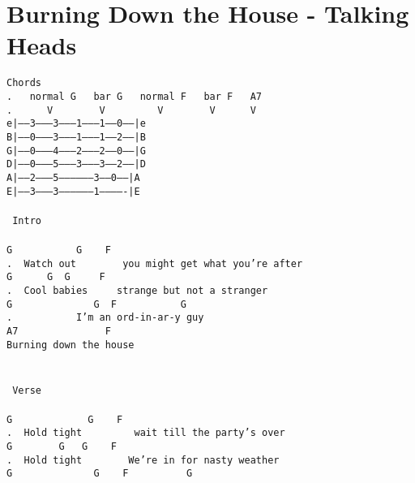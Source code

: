 \newpage
\section{Burning Down the House - Talking Heads}
\label{Burning Down the House - Talking Heads}
\texttt{Chords\\
. \ \ normal\ G\ \ \ bar\ G\ \ \ normal\ F\ \ \ bar\ F\ \ \ A7\\
. \ \ \ \ \ V\ \ \ \ \ \ \ \ V\ \ \ \ \ \ \ \ \ V\ \ \ \ \ \ \ \ V\ \ \ \ \ \ V\\
e|------3--------3---------1--------1------0------|e\\
B|------0--------3---------1--------1------2------|B\\
G|------0--------4---------2--------2------0------|G\\
D|------0--------5---------3--------3------2------|D\\
A|------2--------5------------------3------0------|A\\
E|------3--------3------------------1-------------|E\\
\\
\lbrack\ Intro\rbrack\\
\\
G\ \ \ \ \ \ \ \ \ \ \ G\ \ \ \ F\\
. \ Watch\ out\ \ \ \ \ \ \ \ you\ might\ get\ what\ you're\ after\\
G\ \ \ \ \ \ G\ \ G\ \ \ \ \ F\\
. \ Cool\ babies\ \ \ \ \ strange\ but\ not\ a\ stranger\\
G\ \ \ \ \ \ \ \ \ \ \ \ \ \ G\ \ F\ \ \ \ \ \ \ \ \ \ \ G\\
. \ \ \ \ \ \ \ \ \ \ I'm\ an\ ord-in-ar-y\ guy\\
A7\ \ \ \ \ \ \ \ \ \ \ \ \ \ \ F\\
Burning\ down\ the\ house\\
\\
\\
\lbrack\ Verse\rbrack\\
\\
G\ \ \ \ \ \ \ \ \ \ \ \ \ G\ \ \ \ F\\
. \ Hold\ tight\ \ \ \ \ \ \ \ \ wait\ till\ the\ party's\ over\\
G\ \ \ \ \ \ \ \ G\ \ \ G\ \ \ \ F\\
. \ Hold\ tight\ \ \ \ \ \ \ \ We're\ in\ for\ nasty\ weather\\
G\ \ \ \ \ \ \ \ \ \ \ \ \ \ G\ \ \ \ F\ \ \ \ \ \ \ \ \ \ G\\
}
